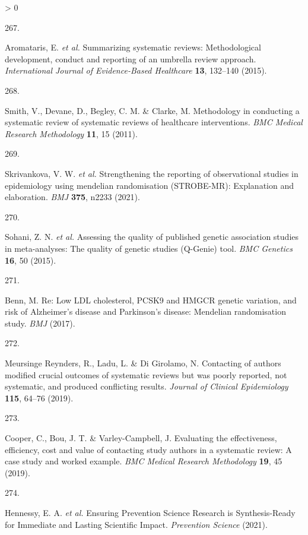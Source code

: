 \documentclass[a4paper, twoside]{templates/ociamthesis}
\newlength{\cslhangindent}
\newlength{\csllabelwidth}
\newenvironment{CSLReferences}[3] %
 {%
  \setlength{\parindent}{0pt}
  \ifodd #1 \everypar{\setlength{\hangindent}{\cslhangindent}}\ignorespaces\fi
  \ifnum #2 > 0
  \setlength{\parskip}{#2\baselineskip}
  \fi
 }%
 {}
\newcommand{\CSLLeftMargin}[1]{\parbox[t]{\maxof{\widthof{#1}}{\csllabelwidth}}{#1}}
\newcommand{\CSLRightInline}[1]{\parbox[t]{\linewidth - \csllabelwidth}{#1}}
\begin{document}
\begin{CSLReferences}{0}{0}
\leavevmode\hypertarget{ref-aromataris2015}{}%
\CSLLeftMargin{267. }
\CSLRightInline{Aromataris, E. \emph{et al.} Summarizing systematic reviews: Methodological development, conduct and reporting of an umbrella review approach. \emph{International Journal of Evidence-Based Healthcare} \textbf{13}, 132--140 (2015).}

\leavevmode\hypertarget{ref-smith2011}{}%
\CSLLeftMargin{268. }
\CSLRightInline{Smith, V., Devane, D., Begley, C. M. \& Clarke, M. Methodology in conducting a systematic review of systematic reviews of healthcare interventions. \emph{BMC Medical Research Methodology} \textbf{11}, 15 (2011).}

\leavevmode\hypertarget{ref-skrivankova2021}{}%
\CSLLeftMargin{269. }
\CSLRightInline{Skrivankova, V. W. \emph{et al.} Strengthening the reporting of observational studies in epidemiology using mendelian randomisation ({STROBE}-{MR}): Explanation and elaboration. \emph{BMJ} \textbf{375}, n2233 (2021).}

\leavevmode\hypertarget{ref-sohani2015}{}%
\CSLLeftMargin{270. }
\CSLRightInline{Sohani, Z. N. \emph{et al.} Assessing the quality of published genetic association studies in meta-analyses: The quality of genetic studies ({Q}-{Genie}) tool. \emph{BMC Genetics} \textbf{16}, 50 (2015).}

\leavevmode\hypertarget{ref-benn2017comment}{}%
\CSLLeftMargin{271. }
\CSLRightInline{Benn, M. Re: Low {LDL} cholesterol, {PCSK9} and {HMGCR} genetic variation, and risk of {Alzheimer}'s disease and {Parkinson}'s disease: Mendelian randomisation study. \emph{BMJ} (2017).}

\leavevmode\hypertarget{ref-meursingereynders2019}{}%
\CSLLeftMargin{272. }
\CSLRightInline{Meursinge Reynders, R., Ladu, L. \& Di Girolamo, N. Contacting of authors modified crucial outcomes of systematic reviews but was poorly reported, not systematic, and produced conflicting results. \emph{Journal of Clinical Epidemiology} \textbf{115}, 64--76 (2019).}

\leavevmode\hypertarget{ref-cooper2019}{}%
\CSLLeftMargin{273. }
\CSLRightInline{Cooper, C., Bou, J. T. \& Varley-Campbell, J. Evaluating the effectiveness, efficiency, cost and value of contacting study authors in a systematic review: A case study and worked example. \emph{BMC Medical Research Methodology} \textbf{19}, 45 (2019).}

\leavevmode\hypertarget{ref-hennessy2021}{}%
\CSLLeftMargin{274. }
\CSLRightInline{Hennessy, E. A. \emph{et al.} Ensuring {Prevention Science Research} is {Synthesis}-{Ready} for {Immediate} and {Lasting Scientific Impact}. \emph{Prevention Science} (2021).}


\end{CSLReferences}
\end{document}
